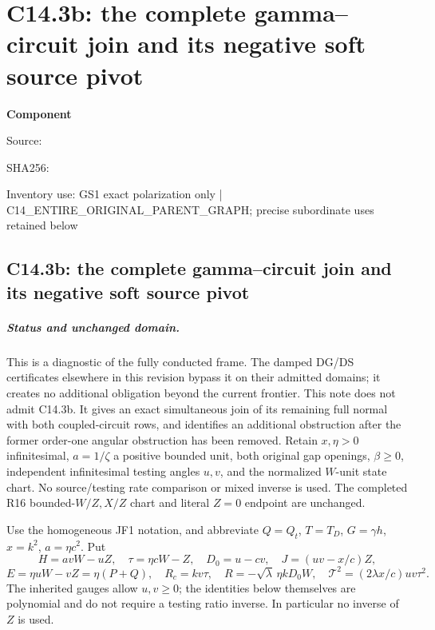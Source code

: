 \chapter{C14.3b: the complete gamma--circuit join and its negative soft source pivot}
\label{component:pd6aedcfef8b0}
\noindent\textbf{Component }\par
{\small\noindent Source: \par}
{\small\noindent SHA256: \par}
{\small\noindent Inventory use: GS1 exact polarization only | C14\_\allowbreak{}ENTIRE\_\allowbreak{}ORIGINAL\_\allowbreak{}PARENT\_\allowbreak{}GRAPH; precise subordinate uses retained below\par}
\medskip
\section{C14.3b: the complete gamma--circuit join and its negative soft source pivot}

\paragraph{Status and unchanged domain.}
This is a diagnostic of the fully conducted frame. The damped DG/DS
certificates elsewhere in this revision bypass it on their admitted
domains; it creates no additional obligation beyond the current frontier.
This note does not admit C14.3b. It gives an exact simultaneous join of
its remaining full normal with both coupled-circuit rows, and identifies
an additional obstruction after the former order-one angular obstruction
has been removed. Retain $x,\eta>0$ infinitesimal, $a=1/\zeta$ a positive
bounded unit, both original gap openings, $\beta\ge0$, independent
infinitesimal testing angles $u,v$, and the normalized $W$-unit state
chart. No source/testing rate comparison or mixed inverse is used.
The completed R16 bounded-$W/Z,X/Z$ chart and literal $Z=0$ endpoint
are unchanged.

Use the homogeneous JF1 notation, and abbreviate $Q=Q_t$, $T=T_D$,
$G=\gamma h$, $x=k^2$, $a=\eta c^2$. Put
\[
 H=avW-uZ,\quad \tau=\eta cW-Z,\quad D_0=u-cv,
 \quad J=(uv-x/c)Z,
\]
\[
 E=\eta uW-vZ=\eta(P+Q),\quad
 R_c=kv\tau,\quad R=-\sqrt\lambda\,\eta kD_0W,
 \quad \mathcal T^2=(2\lambda x/c)uv\tau^2.
\]
The inherited gauges allow $u,v\ge0$; the identities below themselves
are polynomial and do not require a testing ratio inverse. In
particular no inverse of $Z$ is used.

